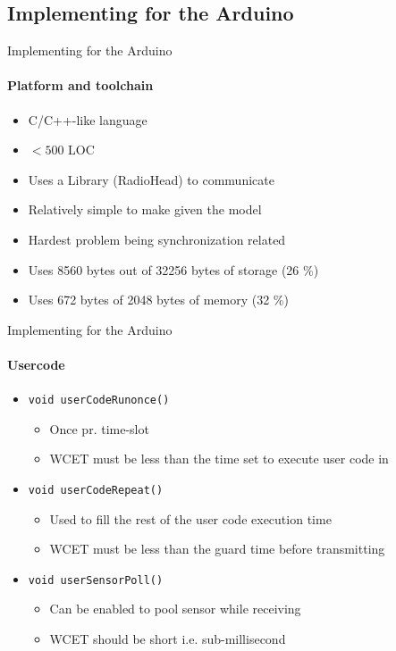     \subsection{Implementing for the Arduino}
    \begin{frame}[t]{Implementing for the Arduino}\framesubtitle{Platform and toolchain}
        \begin{itemize}
            \item C/C++-like language
            \item $< 500$ LOC
            \item Uses a Library (RadioHead) to communicate
            \item Relatively simple to make given the model
            \item Hardest problem being synchronization related
            \item Uses 8560 bytes out of 32256 bytes of storage (26 \%)
            \item Uses 672 bytes of 2048 bytes of memory (32 \%)
        \end{itemize}

    \end{frame}
    \begin{frame}[t]{Implementing for the Arduino}\framesubtitle{Usercode}
        \begin{itemize}
            \item \texttt{void userCodeRunonce()}
            \begin{itemize}
                \item Once pr. time-slot
                \item WCET must be less than the time set to execute user code in
            \end{itemize}
            \item \texttt{void userCodeRepeat()}
            \begin{itemize}
                \item Used to fill the rest of the user code execution time
                \item WCET must be less than the guard time before transmitting
            \end{itemize}
            \item \texttt{void userSensorPoll()}
            \begin{itemize}
                \item Can be enabled to pool sensor while receiving
                \item WCET should be short i.e. sub-millisecond
            \end{itemize}
        \end{itemize}

    \end{frame}

